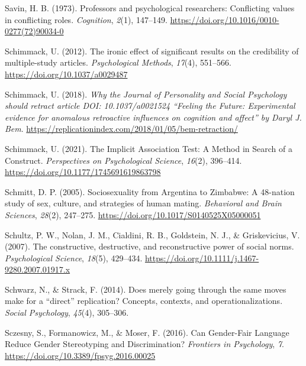 \documentclass[
  letterpaper,
]{book}
\newlength{\cslhangindent}
\newenvironment{CSLReferences}[2] %
 {\begin{list}{}{%
  \setlength{\itemindent}{0pt}
  \setlength{\leftmargin}{0pt}
  \setlength{\parsep}{0pt}
  \ifodd #1
   \setlength{\leftmargin}{\cslhangindent}
   \setlength{\itemindent}{-1\cslhangindent}
  \fi
  \setlength{\itemsep}{#2\baselineskip}}}
 {\end{list}}
\begin{document}
\begin{CSLReferences}{1}{0}
Savin, H. B. (1973). Professors and psychological researchers:
Conflicting values in conflicting roles. \emph{Cognition}, \emph{2}(1),
147--149. \url{https://doi.org/10.1016/0010-0277(72)90034-0}

Schimmack, U. (2012). The ironic effect of significant results on the
credibility of multiple-study articles. \emph{Psychological Methods},
\emph{17}(4), 551--566. \url{https://doi.org/10.1037/a0029487}

Schimmack, U. (2018). \emph{Why the {Journal of Personality and Social
Psychology} should retract article DOI: 10.1037/a0021524 {``Feeling the
Future: Experimental} evidence for anomalous retroactive influences on
cognition and affect'' by {Daryl J. Bem}}.
\url{https://replicationindex.com/2018/01/05/bem-retraction/}

Schimmack, U. (2021). The {Implicit Association Test}: {A Method} in
{Search} of a {Construct}. \emph{Perspectives on Psychological Science},
\emph{16}(2), 396--414. \url{https://doi.org/10.1177/1745691619863798}

Schmitt, D. P. (2005). Sociosexuality from {Argentina} to {Zimbabwe}:
{A} 48-nation study of sex, culture, and strategies of human mating.
\emph{Behavioral and Brain Sciences}, \emph{28}(2), 247--275.
\url{https://doi.org/10.1017/S0140525X05000051}

Schultz, P. W., Nolan, J. M., Cialdini, R. B., Goldstein, N. J., \&
Griskevicius, V. (2007). The constructive, destructive, and
reconstructive power of social norms. \emph{Psychological Science},
\emph{18}(5), 429--434.
\url{https://doi.org/10.1111/j.1467-9280.2007.01917.x}

Schwarz, N., \& Strack, F. (2014). {Does merely going through the same
moves make for a {``direct''} replication? Concepts, contexts, and
operationalizations}. \emph{{Social Psychology}}, \emph{45}(4),
305--306.

Sczesny, S., Formanowicz, M., \& Moser, F. (2016). Can {Gender}-{Fair}
{Language} {Reduce} {Gender} {Stereotyping} and {Discrimination}?
\emph{Frontiers in Psychology}, \emph{7}.
\url{https://doi.org/10.3389/fpsyg.2016.00025}


\end{CSLReferences}
\end{document}
